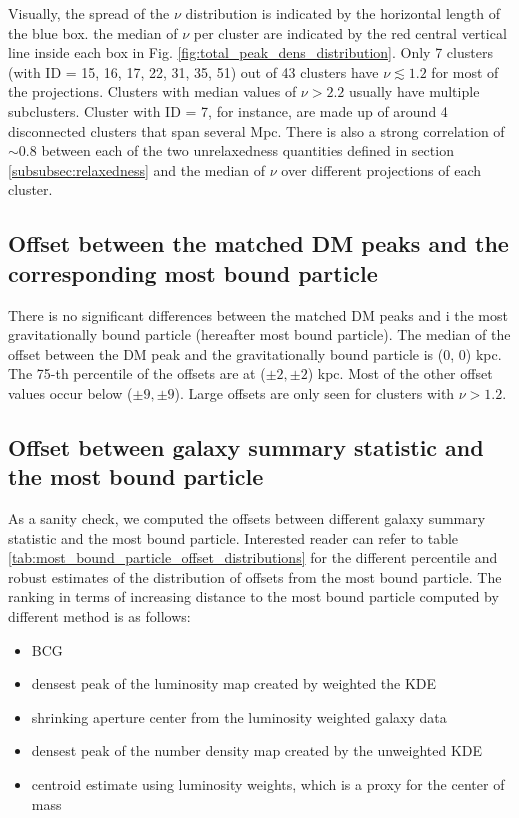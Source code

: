 Visually, the spread of the $\nu$ distribution is indicated by the horizontal 
length of the blue box. 
the median of $\nu$ per cluster are indicated by the red central vertical line
inside each box in Fig. 
\ref{fig:total_peak_dens_distribution}.
Only 7 clusters (with ID = 15, 16, 17, 22, 31, 35, 51) out of 43 clusters have $\nu
\lesssim 1.2$ for most of the projections.
Clusters with median values of $\nu > 2.2$ usually have multiple subclusters.
Cluster with ID = 7, for instance, are made up of around 4 disconnected clusters that span
several Mpc.  
There is also a strong correlation of $\sim 0.8$ 
between each of the two unrelaxedness quantities defined in section 
\ref{subsubsec:relaxedness}
and the median of $\nu$ over different projections of each cluster. 


\subsection{Offset between the matched DM peaks and the corresponding most
bound particle}
There is no significant differences between the matched DM peaks and i
the most gravitationally 
bound particle (hereafter most bound particle).
The median of the offset between the DM peak and the gravitationally bound
particle is (0, 0) kpc. The 75-th percentile of the offsets are at ($\pm2,\pm2$) kpc. 
Most of the other offset values occur below ($\pm 9, \pm 9$). Large offsets
are only seen for clusters with $\nu > 1.2$. 


\subsection{Offset between galaxy summary statistic and the most bound particle}
As a sanity check, we computed the offsets between different galaxy summary
statistic and the most bound particle. 
Interested reader can refer to table
\ref{tab:most_bound_particle_offset_distributions} for the different
percentile and robust estimates of the distribution of offsets from the most bound 
particle. 
The ranking in terms of increasing distance 
to the most bound particle computed by different method is as follows:
\begin{itemize}
	\item BCG 
	\item densest peak of the luminosity map created by weighted the KDE 
		\item shrinking aperture center from the luminosity weighted galaxy data
		\item densest peak of the number density map created by the unweighted KDE 
		\item centroid estimate using luminosity weights, which is a proxy for the
			center of mass
\end{itemize}

